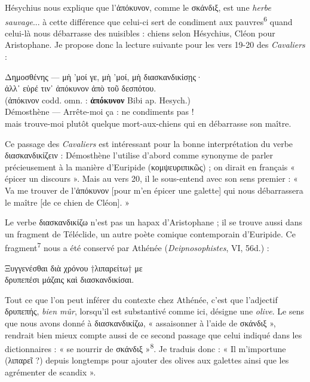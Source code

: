 \documentclass[12pt]{book}%
\newcommand{\italique}[1]{\textit{#1}}%
\newcommand{\citComm}[1]{\begin{quoting}[vskip=0pt] #1 \end{quoting}}%
\newcommand{\lecon}[1]{\textbf{#1}}
\newcommand{\marqueur}[1]{\textsuperscript{#1}}%
\newenvironment{groupe}{%
\pstart%
\ledgroup%
}{%
\pend %
}%
\begin{document}
\begin{pages}
\begin{Leftside}
\begin{groupe}
{{Hésychius nous explique que l'ἀπόκυνον, comme le σκάνδιξ, est une \italique{herbe sauvage}... à cette différence que celui-ci sert de condiment aux pauvres\marqueur{6} quand celui-là nous débarrasse des nuisibles : chiens selon Hésychius, Cléon pour Aristophane. 
Je propose donc la lecture suivante pour les vers 19-20 des \italique{Cavaliers} :
\citComm{Δημοσθένης --- μὴ 'μοί γε, μὴ 'μοί, μὴ διασκανδικίσῃς·\\
ἀλλ᾽ εὑρέ τιν᾽ ἀπόκυνον ἀπὸ τοῦ δεσπότου.\\
(ἀπόκινον codd. omn. : \lecon{ἀπόκυνον} Bibi ap. Hesych.)\\
Démosthène --- Arrête-moi ça : ne condiments pas !\\
mais trouve-moi plutôt quelque mort-aux-chiens qui en débarrasse son maître.}%
Ce passage des \italique{Cavaliers} est intéressant pour la bonne interprétation du verbe διασκανδικίζειν : Démosthène l'utilise d'abord comme synonyme de parler précieusement à la manière d'Euripide (κομψευριπικῶς) ; on dirait en français « épicer un discours ».  Mais au vers 20, il le sous-entend avec son sens premier : « Va me trouver de l'ἀπόκυνον [pour m'en épicer une galette] qui nous débarrassera le maître [de ce chien de Cléon]. »

Le verbe διασκανδικίζω n'est pas un hapax d'Aristophane ; il se trouve aussi dans un fragment de Téléclide, un autre poète comique contemporain d'Euripide. Ce fragment\marqueur{7} nous a été conservé par Athénée (\italique{Deipnosophistes}, VI, 56d.) :
\citComm{Ξυγγενέσθαι διὰ χρόνου †λιπαρείτω† με\\
δρυπεπέσι μάζαις καὶ διασκανδικίσαι.}
Tout ce que l'on peut inférer du contexte chez Athénée, c'est que l'adjectif δρυπεπής, \italique{bien mûr}, lorsqu'il est substantivé comme ici, désigne une \italique{olive}. 
Le sens que nous avons donné à διασκανδικίζω, « assaisonner à l'aide de σκάνδιξ », rendrait bien mieux compte aussi de ce second passage que celui indiqué dans les dictionnaires : « se nourrir de σκάνδιξ »\marqueur{8}.
Je traduis donc : « Il m'importune (λιπαρεῖ ?) depuis longtemps pour ajouter des olives aux galettes ainsi que les agrémenter de scandix ».

}}
\end{groupe}
\end{Leftside}
\end{pages}
\end{document}
